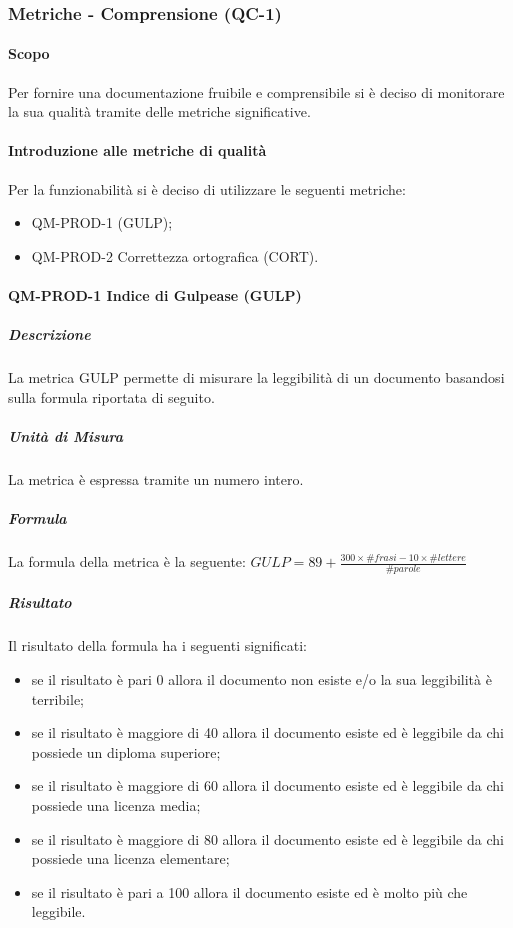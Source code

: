 		\subsubsection{Metriche - Comprensione (QC-1)}
			\paragraph{Scopo}
				Per fornire una documentazione fruibile e comprensibile si è deciso di monitorare la sua qualità tramite delle metriche significative.
			\paragraph{Introduzione alle metriche di qualità}
				Per la funzionabilità si è deciso di utilizzare le seguenti metriche:
				\begin{itemize}
					\item QM-PROD-1  (GULP);
					\item QM-PROD-2 Correttezza ortografica (CORT).
				\end{itemize}
			\paragraph{QM-PROD-1 Indice di Gulpease (GULP)}
				\subparagraph{Descrizione}
					La metrica GULP permette di misurare la leggibilità di un documento basandosi sulla formula riportata di seguito.
				\subparagraph{Unità di Misura}
					La metrica è espressa tramite un numero intero.
				\subparagraph{Formula}
					La formula della metrica è la seguente:
					\(
						GULP = 89+\frac{300\times\# frasi-10\times\#lettere}{\#parole}
					\)
				\subparagraph{Risultato}
					Il risultato della formula ha i seguenti significati:
					\begin{itemize}
						\item se il risultato è pari 0 allora il documento non esiste e/o la sua leggibilità è terribile;
						\item se il risultato è maggiore di 40 allora il documento esiste ed è leggibile da chi possiede un diploma superiore;
						\item se il risultato è maggiore di 60 allora il documento esiste ed è leggibile da chi possiede una licenza media;
						\item se il risultato è maggiore di 80 allora il documento esiste ed è leggibile da chi possiede una licenza elementare;
						\item se il risultato è pari a 100 allora il documento esiste ed è molto più che leggibile.
						\end{itemize}
